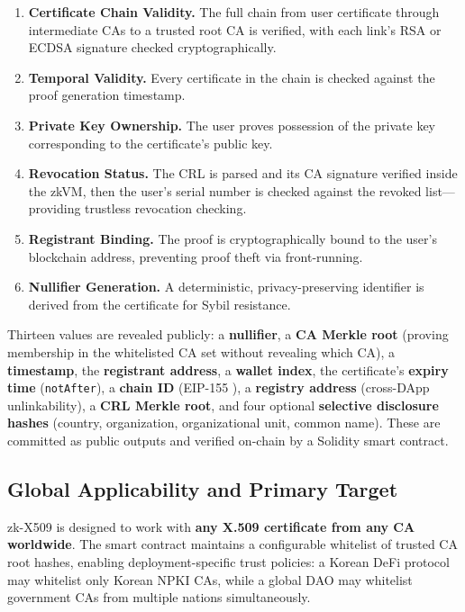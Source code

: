 \documentclass[11pt, a4paper]{article}
\providecommand{\tightlist}{%
  \setlength{\itemsep}{0pt}\setlength{\parskip}{0pt}}
\begin{document}
\begin{enumerate}
\def\labelenumi{\arabic{enumi}.}
\tightlist
\item
  \textbf{Certificate Chain Validity.} The full chain from user
  certificate through intermediate CAs to a trusted root CA is verified,
  with each link's RSA or ECDSA signature checked cryptographically.
\item
  \textbf{Temporal Validity.} Every certificate in the chain is checked
  against the proof generation timestamp.
\item
  \textbf{Private Key Ownership.} The user proves possession of the
  private key corresponding to the certificate's public key.
\item
  \textbf{Revocation Status.} The CRL is parsed and its CA signature
  verified inside the zkVM, then the user's serial number is checked
  against the revoked list---providing trustless revocation checking.
\item
  \textbf{Registrant Binding.} The proof is cryptographically bound to
  the user's blockchain address, preventing proof theft via
  front-running.
\item
  \textbf{Nullifier Generation.} A deterministic, privacy-preserving
  identifier is derived from the certificate for Sybil resistance.
\end{enumerate}

Thirteen values are revealed publicly: a \textbf{nullifier}, a
\textbf{CA Merkle root} (proving membership in the whitelisted CA set
without revealing which CA), a \textbf{timestamp}, the
\textbf{registrant address}, a \textbf{wallet index}, the certificate's
\textbf{expiry time} (\texttt{notAfter}), a \textbf{chain ID} (EIP-155
\cite{ref28}), a \textbf{registry address} (cross-DApp unlinkability), a
\textbf{CRL Merkle root}, and four optional \textbf{selective disclosure
hashes} (country, organization, organizational unit, common name). These
are committed as public outputs and verified on-chain by a Solidity
smart contract.

\subsection{Global Applicability and Primary
Target}\label{global-applicability-and-primary-target}

zk-X509 is designed to work with \textbf{any X.509 certificate from any
CA worldwide}. The smart contract maintains a configurable whitelist of
trusted CA root hashes, enabling deployment-specific trust policies: a
Korean DeFi protocol may whitelist only Korean NPKI CAs, while a global
DAO may whitelist government CAs from multiple nations simultaneously.
\end{document}
